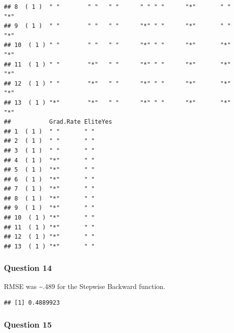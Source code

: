 \documentclass[]{article}
\newenvironment{Shaded}{\begin{snugshade}}{\end{snugshade}}
\newcommand{\DecValTok}[1]{\textcolor[rgb]{0.00,0.00,0.81}{#1}}
\newcommand{\FunctionTok}[1]{\textcolor[rgb]{0.00,0.00,0.00}{#1}}
\newcommand{\NormalTok}[1]{#1}
\newcommand{\OtherTok}[1]{\textcolor[rgb]{0.56,0.35,0.01}{#1}}
\newcommand{\SpecialCharTok}[1]{\textcolor[rgb]{0.00,0.00,0.00}{#1}}
\begin{document}
\begin{verbatim}
## 8  ( 1 )  " "        " "   " "      " " " "      "*"       " "         "*"   
## 9  ( 1 )  " "        " "   " "      "*" " "      "*"       " "         "*"   
## 10  ( 1 ) " "        " "   " "      "*" " "      "*"       "*"         "*"   
## 11  ( 1 ) " "        "*"   " "      "*" " "      "*"       "*"         "*"   
## 12  ( 1 ) " "        "*"   " "      "*" " "      "*"       "*"         "*"   
## 13  ( 1 ) "*"        "*"   " "      "*" " "      "*"       "*"         "*"   
##           Grad.Rate EliteYes
## 1  ( 1 )  " "       " "     
## 2  ( 1 )  " "       " "     
## 3  ( 1 )  " "       " "     
## 4  ( 1 )  "*"       " "     
## 5  ( 1 )  "*"       " "     
## 6  ( 1 )  "*"       " "     
## 7  ( 1 )  "*"       " "     
## 8  ( 1 )  "*"       " "     
## 9  ( 1 )  "*"       " "     
## 10  ( 1 ) "*"       " "     
## 11  ( 1 ) "*"       " "     
## 12  ( 1 ) "*"       " "     
## 13  ( 1 ) "*"       " "
\end{verbatim}

\hypertarget{question-14}{%
\subsubsection{Question 14}\label{question-14}}

RMSE was \textasciitilde.489 for the Stepwise Backward function.

\begin{Shaded}
\end{Shaded}

\begin{verbatim}
## [1] 0.4889923
\end{verbatim}

\hypertarget{question-15}{%
\subsubsection{Question 15}\label{question-15}}
\end{document}
